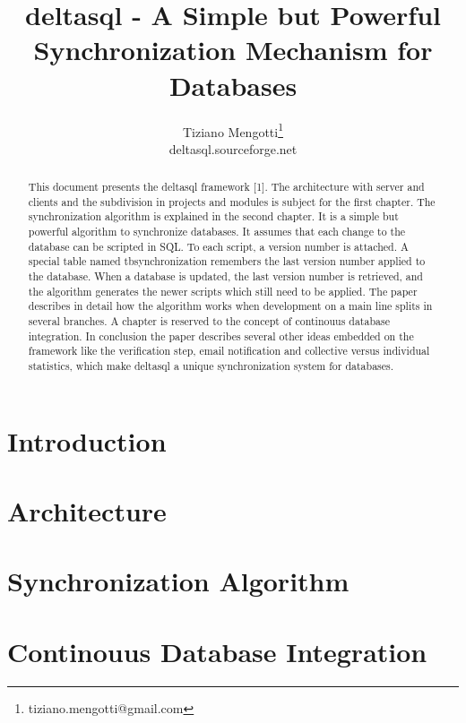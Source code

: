 \documentclass[10pt,a4paper]{article}
\begin{document}
\pagestyle{headings}

\title{deltasql - A Simple but Powerful Synchronization Mechanism for Databases}

\author{Tiziano Mengotti\thanks{tiziano.mengotti@gmail.com}\\
deltasql.sourceforge.net\\}

\maketitle
\thispagestyle{empty}

\begin{abstract}
This document presents the deltasql framework [1]. The architecture with server and clients and the subdivision in projects and modules is subject for the first chapter. The synchronization algorithm is explained in the second chapter. It is a simple but powerful algorithm to synchronize databases. It assumes that each change to the database can be scripted in SQL. To each script, a version number is attached. A special table named tbsynchronization remembers the last version number applied to the database. When a database is updated, the last version number is retrieved, and the algorithm generates the newer scripts which still need to be applied. The paper describes in detail how the algorithm works when development on a main line splits in several branches. A chapter is reserved to the concept of continouus database integration. In conclusion the paper describes several other ideas embedded on the framework like the verification step, email notification and collective versus individual statistics, which make deltasql a unique synchronization system for databases. 
\end{abstract}

\section{Introduction}
\label{sec:intro}


\section{Architecture}

\section{Synchronization Algorithm}

\section{Continouus Database Integration}
\end{document}
